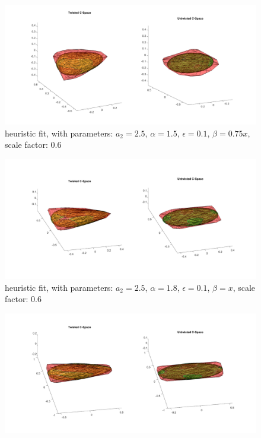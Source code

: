 \documentclass{article}
\begin{document}
\begin{enumerate}
\begin{figure}
\includegraphics[scale = 0.25]{fig/twist-untwist_c-space_fit_scaled_ratio1_5.png}
\caption{heuristic fit, with parameters: $a_2 = 2.5$, $\alpha = 1.5$, $\epsilon = 0.1$, $\beta = 0.75x$, scale factor: 0.6}
\label{fit_scaled1.5}
\end{figure}
\begin{figure}
\includegraphics[scale = 0.25]{fig/twist-untwist_c-space_fit_scaled_ratio1_8.png}
\caption{heuristic fit, with parameters: $a_2 = 2.5$, $\alpha = 1.8$, $\epsilon = 0.1$, $\beta = x$, scale factor: 0.6}
\label{fit_scaled1.8}
\end{figure}
\begin{figure}
\includegraphics[scale = 0.25]{fig/twist-untwist_c-space_fit_scaled_ratio2_2.png}

\end{figure}
\end{enumerate}
\end{document}
